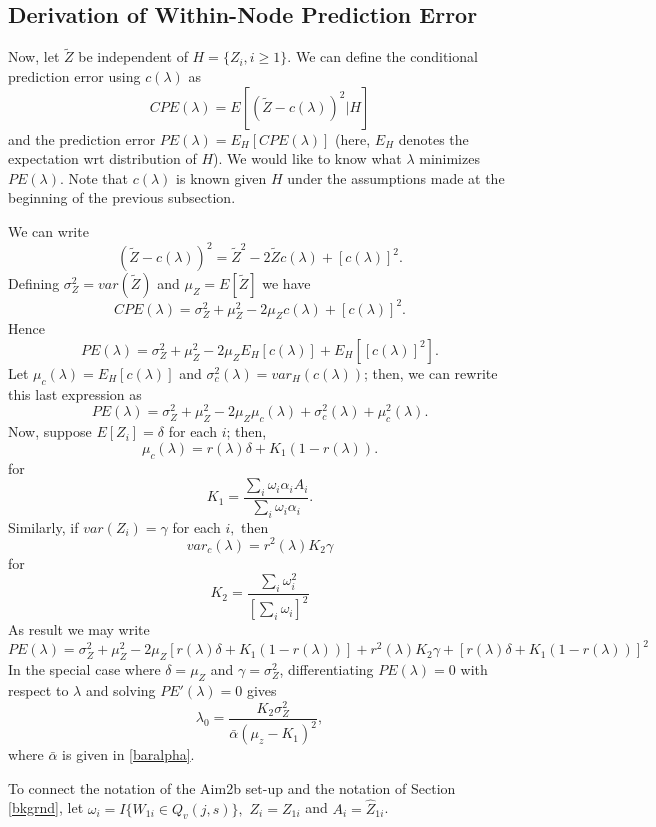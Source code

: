 \documentclass[12pt]{article}
\begin{document}
\subsection{Derivation of Within-Node Prediction Error}
\label{PE}
Now, let $\tilde{Z}$ be independent of $H = \{Z_i, i \geq 1\}.$ We can
define the conditional prediction error using $c(\lambda)$ as
\[
CPE(\lambda) = E\left[ (\tilde Z - c(\lambda))^2 | H \right]
\] 
and the prediction error $PE(\lambda) = E_H\left[ CPE(\lambda)
  \right]$ (here, $E_H$ denotes the expectation wrt distribution of
$H$).  We would like to know what $\lambda$ minimizes
$PE(\lambda)$. Note that $c(\lambda)$ is known given $H$ under the
assumptions made at the beginning of the previous subsection.

We can write
\[
(\tilde Z - c(\lambda))^2 = \tilde Z^2 - 2 \tilde Z c(\lambda) + [c(\lambda)]^2.
\]
Defining $\sigma^2_Z = var(\tilde Z)$ and $\mu_Z = E[\tilde Z]$ we have
\[
CPE(\lambda) = \sigma^2_Z + \mu^2_Z - 2 \mu_Z c(\lambda) + [c(\lambda)]^2.
\]
Hence
\[
PE(\lambda) = \sigma^2_Z + \mu^2_Z - 2 \mu_Z E_H[c(\lambda)] + E_H[[c(\lambda)]^2].
\]
Let $\mu_c(\lambda) = E_H[c(\lambda)] $ and $\sigma^2_c(\lambda) =
var_H(c(\lambda))$; then, we can rewrite this last expression as
\[
PE(\lambda) = \sigma^2_Z + \mu^2_Z - 2 \mu_Z \mu_c(\lambda) + \sigma^2_c(\lambda) + \mu^2_c(\lambda).
\]
Now, suppose $E[Z_i] = \delta$ for each $i$; then,
\[
\mu_c(\lambda) = r(\lambda) \delta+ K_1 (1-r(\lambda)).
\]
for
\[
K_1 =  \frac{ \sum_i \omega_i \alpha_i A_i}{ \sum_i \omega_i \alpha_i }.
\]
Similarly, if $var(Z_i) = \gamma$ for each $i,$ then
\[
var_c(\lambda) = r^2(\lambda) K_2 \gamma
\]
for 
\[
K_2 = \frac{ \sum_i \omega_i^2 }{[ \sum_i \omega_i]^2}
\] 
As result we may write
\[
PE(\lambda) = \sigma^2_Z + \mu^2_Z - 2 \mu_Z [r(\lambda) \delta + K_1 (1-r(\lambda)) ] + 
r^2(\lambda) K_2 \gamma + 
[r(\lambda) \delta + K_1 (1-r(\lambda))]^2
\]
In the special case where $\delta = \mu_Z$ and $\gamma = \sigma^2_Z$,
differentiating $PE(\lambda) = 0$ with respect to $\lambda$ and
solving $PE'(\lambda) = 0$ gives
\begin{equation}
\label{lam-opt1}
\lambda_0 = \frac{K_2 \sigma^2_Z}{ \bar{\alpha} (\mu_z - K_1)^2},
\end{equation}
where $\bar \alpha$ is given in \eqref{baralpha}.



To connect the notation of the Aim2b set-up and the notation of
Section \ref{bkgrnd}, let $\omega_i = I\{ W_{1i} \in Q_{v}(j,s) \},$
$Z_i = Z_{1i}$ and $A_i = \hat Z_{1i}$. 
\end{document}
